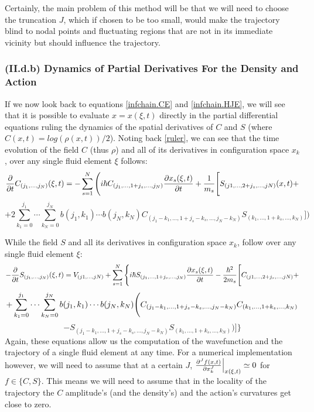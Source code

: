\documentclass[11pt, a4paper]{article} %
\begin{document}
Certainly, the main problem of this method will be that we will need to choose the truncation $J$, which if chosen to be too small, would make the trajectory blind to nodal points and fluctuating regions that are not in its immediate vicinity but should influence the trajectory.\vspace{-0.1cm}

\subsubsection*{(II.d.b) Dynamics of Partial Derivatives For the Density and Action}\vspace{-0.1cm}

If we now look back to equations \eqref{infchain.CE} and \eqref{infchain.HJE}, we will see that it is possible to evaluate $x=x(\xi,t)$ directly in the partial differential equations ruling the dynamics of the spatial derivatives of $C$ and $S$ (where $C(x,t)=log(\rho(x,t))/2$). Noting back \eqref{ruler}, we can see that the time evolution of the field $C$ (thus $\rho$) and all of its derivatives in configuration space $x_k$, over any single fluid element $\xi$ follows:\vspace{-0.1cm}
\begin{equation}\label{infchain.CE.L}
\pdv{}{t}C_{(j_1,...,j_N)}(\xi,t)=-\sum_{s=1}^N \Bigg(i\hbar C_{(j_1,...,1+j_s,...,j_N)}\pdv{x_s(\xi,t)}{t} + \frac{1}{m_s} \Bigg[S_{(j1,...,2+j_s,...,jN)}(x,t)+
\end{equation}
$$
+2 \sum_{k_1=0}^{j_1}\cdots\sum_{k_N=0}^{j_N} b(j_1,k_1)\cdots b(j_N,k_N)C_{(j_1-k_1,...,1+j_s-k_s,...,j_N-k_N)}S_{(k_1,...,1+k_s,...,k_N)} \Bigg]\bigg)
$$

While the field $S$ and all its derivatives in configuration space $x_k$, follow over any single fluid element $\xi$:\vspace{-0.1cm}
\begin{equation}\label{infchain.HJE.L}
-\pdv{}{t}S_{(j_1,...,j_N)}(\xi,t)=V_{(j1,...,jN)}+\sum_{s=1}^N\Bigg\{ i\hbar S_{(j_1,...,1+j_s,...,j_N)}\pdv{x_s(\xi,t)}{t}-\frac{\hbar^2}{2m_s} \Bigg[ C_{(j1,...,2+j_s,...,jN)}+\vspace{-0.1cm}
\end{equation}
$$
+\sum_{k_1=0}^{j_1}\cdots\sum_{k_N=0}^{j_N} b(j_1,k_1)\cdots b(j_N,k_N) \Bigg( C_{(j_1-k_1,...,1+j_s-k_s,...,j_N-k_N)}C_{(k_1,...,1+k_s,...,k_N)} \vspace{-0.1cm}
$$
$$
-S_{(j_1-k_1,...,1+j_s-k_s,...,j_N-k_N)}S_{(k_1,...,1+k_s,...,k_N)}  \Bigg)\Bigg]\Bigg\}
$$
Again, these equations allow us the computation of the wavefunction and the trajectory of a single fluid element at any time. For a numerical implementation however, we will need to assume that at a certain $J$, $\pdv[J]{f(x,t)}{x_k}\Big\rvert_{x(\xi,t)}\simeq 0$ for $f\in\{ C,S\}$. This means we will need to assume that in the locality of the trajectory the $C$ amplitude's (and the density's) and the action's curvatures get close to zero.\\
\end{document}
